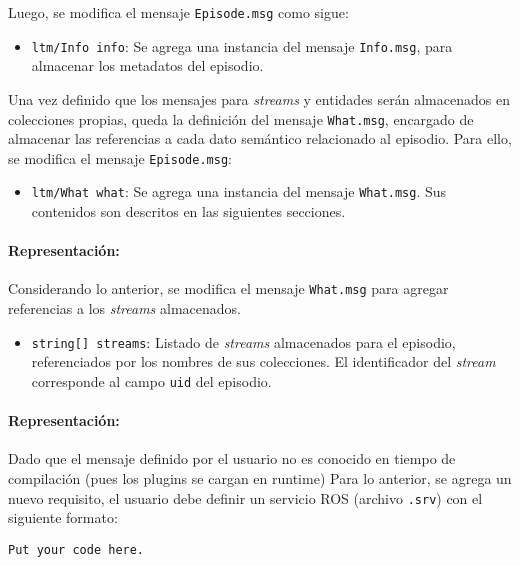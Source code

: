 Luego, se modifica el mensaje \texttt{Episode.msg} como sigue:
\begin{itemize}
	\item \texttt{ltm/Info info}: Se agrega una instancia del mensaje \texttt{Info.msg}, para almacenar los metadatos del episodio.
\end{itemize}

Una vez definido que los mensajes para \textit{streams} y entidades serán almacenados en colecciones propias, queda la definición del mensaje \texttt{What.msg}, encargado de almacenar las referencias a cada dato semántico relacionado al episodio. Para ello, se modifica el mensaje \texttt{Episode.msg}:
\begin{itemize}
	\item \texttt{ltm/What what}: Se agrega una instancia del mensaje \texttt{What.msg}. Sus contenidos son descritos en las siguientes secciones.
\end{itemize}


\paragraph{Representación:}
Considerando lo anterior, se modifica el mensaje \texttt{What.msg} para agregar referencias a los \textit{streams} almacenados.
\begin{itemize}
	\item \texttt{string[] streams}: Listado de \textit{streams} almacenados para el episodio,  referenciados por los nombres de sus colecciones. El identificador del \textit{stream} corresponde al campo \texttt{uid} del episodio.
\end{itemize}

\paragraph{Representación:}




Dado que el mensaje definido por el usuario no es conocido en tiempo de compilación (pues los plugins se cargan en runtime)
Para lo anterior, se agrega un nuevo requisito, el usuario debe definir un servicio ROS (archivo \texttt{.srv}) con el siguiente formato:
\lstset{style=/Style/ROS/MSG}
\begin{lstlisting}
Put your code here.
\end{lstlisting}



